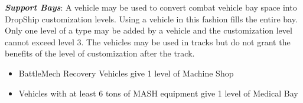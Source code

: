 \emph{\bfseries Support Bays}: A vehicle may be used to convert combat vehicle bay space into DropShip customization levels.
Using a vehicle in this fashion fills the entire bay.
Only one level of a type may be added by a vehicle and the customization level cannot exceed level 3.
The vehicles may be used in tracks but do not grant the benefits of the level of customization after the track.

\begin{itemize}

\item BattleMech Recovery Vehicles give 1 level of Machine Shop

\item Vehicles with at least 6 tons of MASH equipment give 1 level of Medical Bay

\end{itemize}
